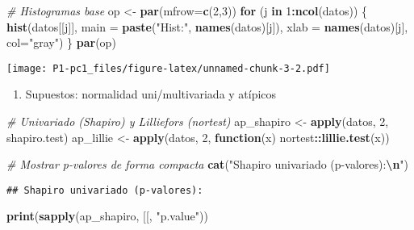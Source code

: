 \documentclass[
]{article}
\newenvironment{Shaded}{\begin{snugshade}}{\end{snugshade}}
\newcommand{\AttributeTok}[1]{\textcolor[rgb]{0.13,0.29,0.53}{#1}}
\newcommand{\CommentTok}[1]{\textcolor[rgb]{0.56,0.35,0.01}{\textit{#1}}}
\newcommand{\ControlFlowTok}[1]{\textcolor[rgb]{0.13,0.29,0.53}{\textbf{#1}}}
\newcommand{\DecValTok}[1]{\textcolor[rgb]{0.00,0.00,0.81}{#1}}
\newcommand{\FunctionTok}[1]{\textcolor[rgb]{0.13,0.29,0.53}{\textbf{#1}}}
\newcommand{\NormalTok}[1]{#1}
\newcommand{\OtherTok}[1]{\textcolor[rgb]{0.56,0.35,0.01}{#1}}
\newcommand{\SpecialCharTok}[1]{\textcolor[rgb]{0.81,0.36,0.00}{\textbf{#1}}}
\newcommand{\StringTok}[1]{\textcolor[rgb]{0.31,0.60,0.02}{#1}}
\providecommand{\tightlist}{%
  \setlength{\itemsep}{0pt}\setlength{\parskip}{0pt}}
\begin{document}
\begin{Shaded}
\begin{Highlighting}[]
\CommentTok{\# Histogramas base}
\NormalTok{op }\OtherTok{\textless{}{-}} \FunctionTok{par}\NormalTok{(}\AttributeTok{mfrow=}\FunctionTok{c}\NormalTok{(}\DecValTok{2}\NormalTok{,}\DecValTok{3}\NormalTok{))}
\ControlFlowTok{for}\NormalTok{ (j }\ControlFlowTok{in} \DecValTok{1}\SpecialCharTok{:}\FunctionTok{ncol}\NormalTok{(datos)) \{}
  \FunctionTok{hist}\NormalTok{(datos[[j]], }\AttributeTok{main =} \FunctionTok{paste}\NormalTok{(}\StringTok{"Hist:"}\NormalTok{, }\FunctionTok{names}\NormalTok{(datos)[j]), }\AttributeTok{xlab =} \FunctionTok{names}\NormalTok{(datos)[j], }\AttributeTok{col=}\StringTok{"gray"}\NormalTok{)}
\NormalTok{\}}
\FunctionTok{par}\NormalTok{(op)}
\end{Highlighting}
\end{Shaded}

\texttt{[image: P1-pc1\_files/figure-latex/unnamed-chunk-3-2.pdf]}

\begin{enumerate}
\def\labelenumi{\arabic{enumi})}
\setcounter{enumi}{2}
\tightlist
\item
  Supuestos: normalidad uni/multivariada y atípicos
\end{enumerate}

\begin{Shaded}
\begin{Highlighting}[]
\CommentTok{\# Univariado (Shapiro) y Lilliefors (nortest)}
\NormalTok{ap\_shapiro }\OtherTok{\textless{}{-}} \FunctionTok{apply}\NormalTok{(datos, }\DecValTok{2}\NormalTok{, shapiro.test)}
\NormalTok{ap\_lillie  }\OtherTok{\textless{}{-}} \FunctionTok{apply}\NormalTok{(datos, }\DecValTok{2}\NormalTok{, }\ControlFlowTok{function}\NormalTok{(x) nortest}\SpecialCharTok{::}\FunctionTok{lillie.test}\NormalTok{(x))}

\CommentTok{\# Mostrar p{-}valores de forma compacta}
\FunctionTok{cat}\NormalTok{(}\StringTok{"Shapiro univariado (p{-}valores):}\SpecialCharTok{\textbackslash{}n}\StringTok{"}\NormalTok{)}
\end{Highlighting}
\end{Shaded}

\begin{verbatim}
## Shapiro univariado (p-valores):
\end{verbatim}

\begin{Shaded}
\begin{Highlighting}[]
\FunctionTok{print}\NormalTok{(}\FunctionTok{sapply}\NormalTok{(ap\_shapiro, }\StringTok{\textasciigrave{}}\AttributeTok{[[}\StringTok{\textasciigrave{}}\NormalTok{, }\StringTok{"p.value"}\NormalTok{))}
\end{Highlighting}
\end{Shaded}
\end{document}
